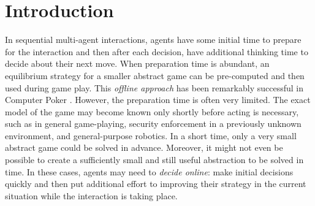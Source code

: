 \documentclass[letterpaper]{article}
\begin{document}
\section{Introduction}


In sequential multi-agent interactions, agents have some initial time to prepare for the interaction and then after each decision, have  additional thinking time to decide about their next move. When preparation time is abundant, an equilibrium strategy for a smaller abstract game can be pre-computed and then used during game play. This {\it offline approach} has been remarkably successful in 
Computer Poker \cite{Sandholm10The,Rubin11Poker,Gilpin09,Johanson07Msc,Johanson13Evaluating}.
However, the preparation time is often very limited. The exact model of the game may become known only shortly before acting is necessary, such as in general game-playing, security enforcement in a previously unknown environment, and general-purpose robotics. In a short time, only a very small abstract game could be solved in advance. Moreover, it might not even be possible to create a sufficiently small and still useful abstraction to be solved in time. In these cases, agents may need to {\it decide online}: make initial decisions quickly and then put additional effort to improving their strategy in the current situation while the interaction is taking place.
\end{document}
